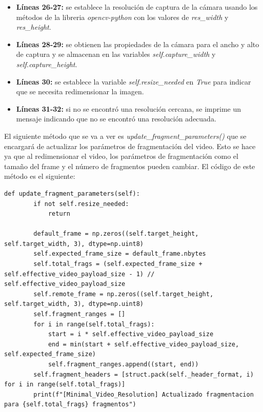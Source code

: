 \begin{itemize}
    \item \textbf{Líneas 26-27:} se establece la resolución de captura de la cámara usando los métodos de la libreria \textit{opencv-python} con los valores de \textit{res\_width} y \textit{res\_height}.
    \item \textbf{Líneas 28-29:} se obtienen las propiedades de la cámara para el ancho y alto de captura y se almacenan en las variables \textit{self.capture\_width} y \textit{self.capture\_height}.
    \item \textbf{Líneas 30:} se establece la variable \textit{self.resize\_needed} en \textit{True} para indicar que se necesita redimensionar la imagen.
    \item \textbf{Líneas 31-32:} si no se encontró una resolución cercana, se imprime un mensaje indicando que no se encontró una resolución adecuada.
\end{itemize}
\vspace{\baselineskip}

El siguiente método que se va a ver es \textit{update\_fragment\_parameters()} que se encargará de actualizar los parámetros de fragmentación del video. Esto se hace ya que al redimensionar el video, los parámetros de fragmentación como el tamaño del frame y el número de fragmentos pueden cambiar. El código de este método es el siguiente:
\begin{lstlisting}[style=pythonstyle, caption={Método update\_fragment\_parameters() de \textit{Minimal\_Video\_Resolution}}, label={lst:update_fragment_parameters_minimal_video_resolution}]
def update_fragment_parameters(self):
        if not self.resize_needed:
            return

        default_frame = np.zeros((self.target_height, self.target_width, 3), dtype=np.uint8)
        self.expected_frame_size = default_frame.nbytes
        self.total_frags = (self.expected_frame_size + self.effective_video_payload_size - 1) // self.effective_video_payload_size
        self.remote_frame = np.zeros((self.target_height, self.target_width, 3), dtype=np.uint8)
        self.fragment_ranges = []
        for i in range(self.total_frags):
            start = i * self.effective_video_payload_size
            end = min(start + self.effective_video_payload_size, self.expected_frame_size)
            self.fragment_ranges.append((start, end))
        self.fragment_headers = [struct.pack(self._header_format, i) for i in range(self.total_frags)]
        print(f"[Minimal_Video_Resolution] Actualizado fragmentacion para {self.total_frags} fragmentos")
\end{lstlisting}
\vspace{\baselineskip}

